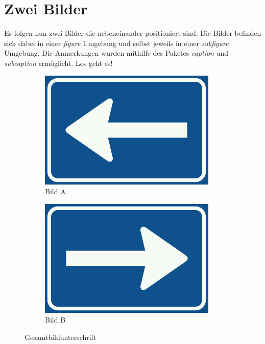 \documentclass{scrreprt}
\begin{document}
	\newpage

		\section{Zwei Bilder \cite{ref4}}
		\label{se:zweibilder}

		Es folgen nun zwei Bilder die nebeneinander positioniert sind. Die Bilder befinden sich dabei
		in einer \textit{figure} Umgebung und selbst jeweils in einer \textit{subfigure} Umgebung. Die Anmerkungen wurden mithilfe des Paketes \textit{caption} und \textit{subcaption} ermöglicht. Los geht es!
		\vspace{10pt}
		\begin{figure}[h!]
			\centering
			\begin{subfigure}{.5\textwidth}
				\centering
				\includegraphics[width=.9\linewidth]{images/Nederlands_verkeersbord_C4_(links).png}
				\caption{Bild A}
				\label{fig:bilda}
				
			\end{subfigure}%
			\begin{subfigure}{.5\textwidth}
				\centering
				\includegraphics[width=.9\linewidth]{images/Nederlands_verkeersbord_C4_(rechts).png}
				\caption{Bild B}
				\label{fig:bildb}
				
			\end{subfigure}
			\caption{Gesamtbildunterschrift}
		
		\end{figure}
\end{document}
